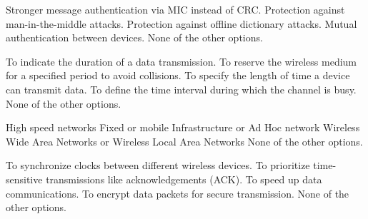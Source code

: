 \begin{checkboxes}
    \choice Stronger message authentication via MIC instead of CRC.
    \CorrectChoice Protection against man-in-the-middle attacks.
    \CorrectChoice Protection against offline dictionary attacks.
    \CorrectChoice Mutual authentication between devices.
    \choice None of the other options.
\end{checkboxes}

\begin{checkboxes}
    \choice To indicate the duration of a data transmission.
    \CorrectChoice To reserve the wireless medium for a specified period to avoid collisions.
    \choice To specify the length of time a device can transmit data.
    \choice To define the time interval during which the channel is busy.
    \choice None of the other options.
\end{checkboxes}

\begin{checkboxes}
    \choice High speed networks
    \CorrectChoice Fixed or mobile
    \CorrectChoice Infrastructure or Ad Hoc network
    \CorrectChoice Wireless Wide Area Networks or Wireless Local Area Networks
    \choice None of the other options.
\end{checkboxes}

\begin{checkboxes}
    \choice To synchronize clocks between different wireless devices.
    \choice To prioritize time-sensitive transmissions like acknowledgements (ACK).
    \choice To speed up data communications.
    \choice To encrypt data packets for secure transmission.
    \CorrectChoice None of the other options.
\end{checkboxes}